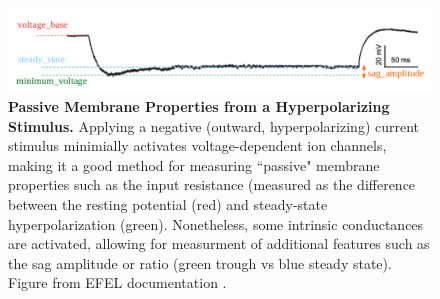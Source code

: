 
\begin{figure}
\begin{center}
\includegraphics{figures/sag_amplitude}
\end{center}
\caption[Passive Membrane Properties Measured from a Hyperpolarizing Current Stimulus]{\textbf{Passive Membrane Properties from a Hyperpolarizing Stimulus.} Applying a negative (outward, hyperpolarizing) current stimulus minimially activates voltage-dependent ion channels, making it a good method for measuring ``passive" membrane properties such as the input resistance (measured as the difference between the resting potential (red) and steady-state hyperpolarization (green).
Nonetheless, some intrinsic conductances are activated, allowing for measurment of additional features such as the sag amplitude or ratio (green trough vs blue steady state). Figure from EFEL documentation \citep{efel-docs}.}
\label{fig:voltage_figures}
\end{figure}

